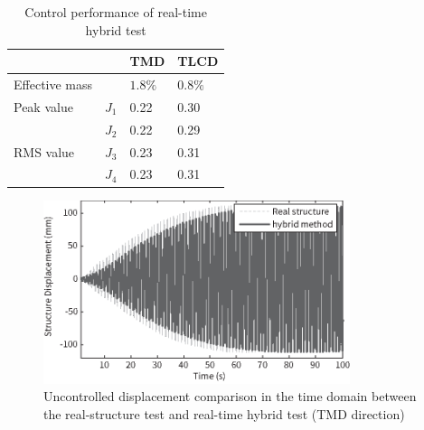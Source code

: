 \begin{table}[ht]
\centering
\begin{tabularx}{\textwidth}{@{}XXXX@{}}
\toprule[1pt]\midrule[0.3pt]
&& TMD & TLCD\\ \hline
Effective mass && $1.8\%$ & $0.8\%$\\
Peak value & $J_{1}$ & 0.22 & 0.30\\
& $J_{2}$ & 0.22 & 0.29\\
RMS value & $J_{3}$ & 0.23 & 0.31\\
& $J_{4}$ & 0.23 & 0.31\\
\bottomrule
\end{tabularx}
\caption{Control performance of real-time hybrid test}
\label{tab:5-5}
\end{table}

\begin{figure}[ht]
\centering
\includegraphics[width=0.8\textwidth] {figure/5-25.eps}
\caption{Uncontrolled displacement comparison in the time domain between the real-structure test and real-time hybrid test (TMD direction)}
\label{fig:5-25}
\end{figure}



